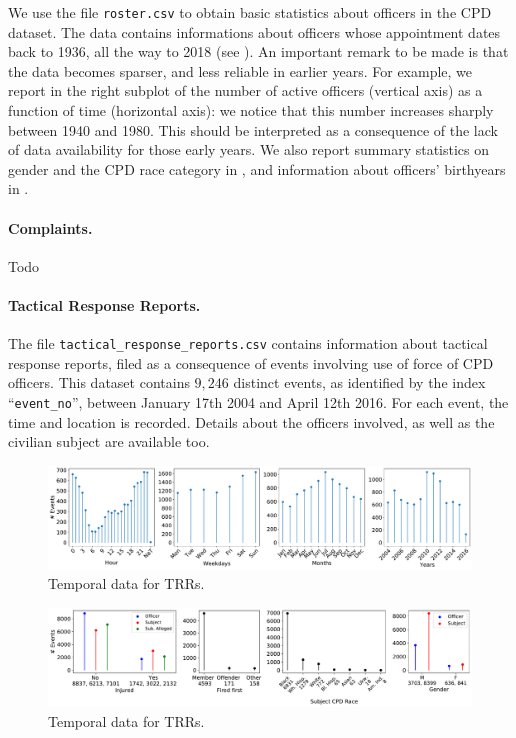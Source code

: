 We use the file \texttt{roster.csv} to obtain basic statistics about officers in the CPD dataset. The data contains informations about officers whose appointment dates back to 1936, all the way to 2018 (see ). An important remark to be made is that the data becomes sparser, and less reliable in earlier years. For example, we report in the right subplot of  the number of active officers (vertical axis) as a function of time (horizontal axis): we notice that this number increases sharply between 1940 and 1980. This should be interpreted as a consequence of the lack of data availability for those early years. We also report summary statistics on gender and the CPD race category in , and information about officers' birthyears in .

\paragraph{Complaints.} 
Todo

\paragraph{Tactical Response Reports.}
The file \texttt{tactical\_response\_reports.csv} contains information about
tactical response reports, filed as a consequence of  events involving use of
force of CPD officers. This dataset contains $9{,}246$ distinct events, as
identified by the index ``\texttt{event\_no}'', between January 17th 2004 and
April 12th 2016. For each event, the time and location is recorded. Details
about the officers involved, as well as the civilian subject are available too. 

\begin{figure}[h] 
	\includegraphics[width=\textwidth]{figs/trrs_times} 
	\caption{Temporal data for TRRs.} \label{fig:trrs_times}
\end{figure}

\begin{figure}[h] 
	\includegraphics[width=\textwidth]{figs/trr_stats} 
	\caption{Temporal data for TRRs.} \label{fig:trrs_stats1}
\end{figure}

